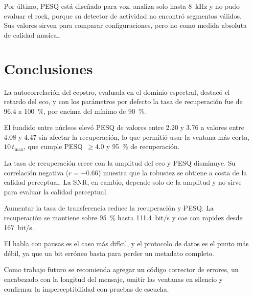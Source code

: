 \documentclass[journal]{IEEEtran}
\begin{document}
Por último, PESQ está diseñado para voz, analiza
solo hasta 8~kHz y no pudo evaluar el rock, porque su detector de actividad no
encontró segmentos válidos. Sus valores sirven para comparar configuraciones,
pero no como medida absoluta de calidad musical.


\section{Conclusiones}\label{sec:conclusiones}
La autocorrelación del cepstro, evaluada en el dominio espectral, destacó el
retardo del eco, y con los parámetros por defecto la tasa de recuperación fue
de 96.4 a 100~\%, por encima del mínimo de 90~\%.

El fundido entre núcleos elevó PESQ de valores entre 2.20 y 3.76 a valores
entre 4.08 y 4.47 sin afectar la recuperación, lo que permitió usar la ventana
más corta, $10\,t_{\max}$, que cumple PESQ~$\geq 4.0$ y 95~\% de recuperación.

La tasa de recuperación crece con la amplitud del eco y PESQ disminuye. Su
correlación negativa ($r=-0.66$) muestra que la robustez se obtiene a costa de
la calidad perceptual. La SNR, en cambio, depende solo de la amplitud y no sirve
para evaluar la calidad perceptual.

Aumentar la tasa de transferencia reduce la recuperación y PESQ. La
recuperación se mantiene sobre 95~\% hasta 111.4~bit/s y cae con rapidez desde
167~bit/s.

El habla con pausas es el caso más difícil, y el protocolo de datos es el punto
más débil, ya que un bit erróneo basta para perder un metadato completo.

Como trabajo futuro se recomienda agregar un código corrector de errores, un
encabezado con la longitud del mensaje, omitir las ventanas en silencio y
confirmar la imperceptibilidad con pruebas de escucha.




\end{document}
